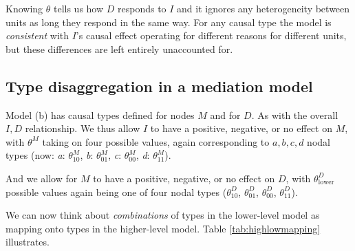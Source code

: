 \documentclass[12pt,]{book}
\begin{document}
Knowing \(\theta\) tells us how \(D\) responds to \(I\) and it ignores any heterogeneity between units as long they respond in the same way. For any causal type the model is \emph{consistent} with \(I\)'s causal effect operating for different reasons for different units, but these differences are left entirely unaccounted for.

\hypertarget{type-disaggregation-in-a-mediation-model}{%
\subsection{Type disaggregation in a mediation model}\label{type-disaggregation-in-a-mediation-model}}

Model (b) has causal types defined for nodes \(M\) and for \(D\). As with the overall \(I,D\) relationship. We thus allow \(I\) to have a positive, negative, or no effect on \(M\), with \(\theta^M\) taking on four possible values, again corresponding to \(a,b,c,d\) nodal types (now: \emph{a}: \(\theta_{10}^M\), \emph{b}: \(\theta_{01}^M\), \emph{c}: \(\theta_{00}^M\), \emph{d}: \(\theta_{11}^M\)).

And we allow for \(M\) to have a positive, negative, or no effect on \(D\), with \(\theta^D_{\text{lower}}\) possible values again being one of four nodal types (\(\theta_{10}^D\), \(\theta_{01}^D\), \(\theta_{00}^D\), \(\theta_{11}^D\)).

We can now think about \emph{combinations} of types in the lower-level model as mapping onto types in the higher-level model. Table \ref{tab:highlowmapping} illustrates.
\end{document}
